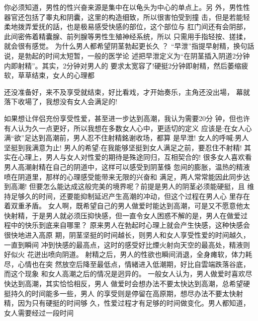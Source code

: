 \documentclass[12pt,UTF8]{ctexbook}
\begin{document}
你必须知道，男性的性兴奋来源是集中在以龟头为中心的单点上。另
外，男性性器官还包括了睾丸和阴囊，这里的构造细致，所以很害怕受到撞
击，但是若能轻柔地拨弄爱抚的話，也是极易感受快感的部位，这个部位与
肛门间还有会阴部，此间密佈着精囊腺、前列腺等男性生殖神经系统，所以
只需用手指轻按、搓揉，就会很有感觉。
为什么男人都希望阴茎勃起更长久 ？
“早泄”指提早射精，换句話说，是勃起的时间太短暂，一般的医学论
述把早泄定义为“在阴茎插入阴道2分钟内即射精”。其实，2分钟对男人的
要求太宽容了!硬挺2分钟即射精，然后萎缩疲软，草草结束，女人的心理都

还没准备好，来不及享受就结束，好比看戏，才开始奏乐，主角还没出場，
幕就落下收場了，我想没有女人会满足的!

如果想让伴侣充份享受性爱，甚至进一步达到高潮，我认为需要20分
钟，但也许有人认为久一点更好，所以我想在多数女人心中，更适切的定义
应该是:在女人心满“欲”足达到高潮前，男人忍不住射精銘谢收场，都算
是早泄!
女人的呼喊:男人坚挺到我满意为止!
男人的希望:在我能够坚挺到女人满足之前，要忍住不射精!
其实在心理上，男人与女人对性爱的期待是殊途同归，互相契合的!
很多女人喜欢看男人高潮射精在自己的阴道中，这样可以感受到阴茎倏
忽间的膨胀，温热的精液喷在阴道里，那样的心理感受能带来无限的兴奋和
满足，两人常常能因此同步达到高潮!
但要怎么能达成这般完美的境界呢？前提是男人的阴茎必须能硬挺，且
维持足够久的时间，还要能抑制延迟产生高潮的冲动，但这个过程在男人心
里存在着双重矛盾。
女人啊，既希望自己的男人做爱时能达到高潮，可是又不愿意他太快射精，于是男人就必须压抑快感，但一直令女人困惑不解的是，男人在做爱过
程中的快乐到底来自哪里？
原来男人在勃起时心理上就会产生快感，这种快感会很快地进入高原
期，阴茎坚挺的时间越长，则男人和女人享受性爱的时间越久，一直到瞬间
冲到快感的最高点，这时的感受好比煙火射向天空的最高处，精液则好似火
花迸出喷向阴道。
射精之后，男人的性欲也瞬间消退，全身瘫软，体力耗尽，心情也在突
然放空后降至最低点，情緒进入低潮期，好比自雲端跌落谷底，而这个现象
和女人高潮之后的情况是迥异的。
一般女人认为，男人做爱时喜欢尽快达到高潮，其实恰恰相反，男人
做爱时会想办法不要太快达到高潮，总希望硬挺持久的时间能多一些，男人
的享受则是停留在高原期，想尽办法不要太快射精，因为只有硬挺的时间够
久，性爱过程才有足够的时间做变化。男人都知道，女人需要经过一段时间
\end{document}
